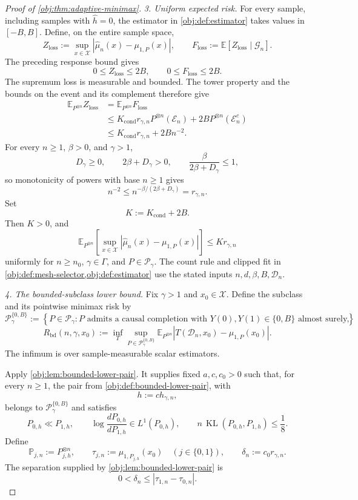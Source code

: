 \documentclass[11pt]{article}
\begin{document}
\begin{proof}[Proof of \cref{obj:thm:adaptive-minimax}]
\emph{3. Uniform expected risk.}
For every sample, including samples with \(\widehat h=0\), the estimator in \cref{obj:def:estimator} takes values in \([-B,B]\). Define, on the entire sample space,
\[
Z_{\mathrm{loss}}
:=
\sup_{x\in\mathcal X}
|\widehat\mu_n(x)-\mu_{1,P}(x)|,
\qquad
F_{\mathrm{loss}}
:=
\mathbb E[Z_{\mathrm{loss}}\mid\mathcal G_n].
\]
The preceding response bound gives
\[
0\le Z_{\mathrm{loss}}\le2B,
\qquad
0\le F_{\mathrm{loss}}\le2B.
\]
The supremum loss is measurable and bounded. The tower property and the bounds on the event and its complement therefore give
\[
\begin{aligned}
\mathbb E_{P^{\otimes n}}Z_{\mathrm{loss}}
&=\mathbb E_{P^{\otimes n}}F_{\mathrm{loss}}
\\
&\le
K_{\mathrm{cond}}r_{\gamma,n}
P^{\otimes n}(\mathcal E_n)
+
2B P^{\otimes n}(\mathcal E_n^c)
\\
&\le K_{\mathrm{cond}}r_{\gamma,n}+2Bn^{-2}.
\end{aligned}
\]
For every \(n\ge1\), \(\beta>0\), and \(\gamma>1\),
\[
D_\gamma\ge0,
\qquad
2\beta+D_\gamma>0,
\qquad
\frac{\beta}{2\beta+D_\gamma}\le1,
\]
so monotonicity of powers with base \(n\ge1\) gives
\[
n^{-2}
\le n^{-\beta/(2\beta+D_\gamma)}
=r_{\gamma,n}.
\]
Set
\[
K:=K_{\mathrm{cond}}+2B.
\]
Then \(K>0\), and
\[
\mathbb E_{P^{\otimes n}}
\left[
\sup_{x\in\mathcal X}
|\widehat\mu_n(x)-\mu_{1,P}(x)|
\right]
\le Kr_{\gamma,n}
\]
uniformly for \(n\ge n_0\), \(\gamma\in\Gamma\), and \(P\in\mathcal P_\gamma\). The count rule and clipped fit in \cref{obj:def:mesh-selector,obj:def:estimator} use the stated inputs \(n,d,\beta,B,\mathcal D_n\).

\emph{4. The bounded-subclass lower bound.}
Fix \(\gamma>1\) and \(x_0\in\mathcal X\). Define the subclass and its pointwise minimax risk by
\[
\mathcal P_\gamma^{\{0,B\}}
:=
\left\{
P\in\mathcal P_\gamma:
P\text{ admits a causal completion with }
Y(0),Y(1)\in\{0,B\}\text{ almost surely}
\right\},
\]
\[
R_{\mathrm{bd}}(n,\gamma,x_0)
:=
\inf_T\sup_{P\in\mathcal P_\gamma^{\{0,B\}}}
\mathbb E_{P^{\otimes n}}
|T(\mathcal D_n,x_0)-\mu_{1,P}(x_0)|.
\]
The infimum is over sample-measurable scalar estimators.

Apply \cref{obj:lem:bounded-lower-pair}. It supplies fixed \(a,c,c_0>0\) such that, for every \(n\ge1\), the pair from \cref{obj:def:bounded-lower-pair}, with
\[
h:=ch_{\gamma,n},
\]
belongs to \(\mathcal P_\gamma^{\{0,B\}}\) and satisfies
\[
P_{0,h}\ll P_{1,h},
\qquad
\log\frac{dP_{0,h}}{dP_{1,h}}\in L^1(P_{0,h}),
\qquad
n\,\operatorname{KL}(P_{0,h},P_{1,h})\le\frac18.
\]
Define
\[
\mathbb P_{j,n}:=P_{j,h}^{\otimes n},
\qquad
\tau_{j,n}:=\mu_{1,P_{j,h}}(x_0)
\quad(j\in\{0,1\}),
\qquad
\delta_n:=c_0r_{\gamma,n}.
\]
The separation supplied by \cref{obj:lem:bounded-lower-pair} is
\[
0<\delta_n\le|\tau_{1,n}-\tau_{0,n}|.
\]


\end{proof}
\end{document}
